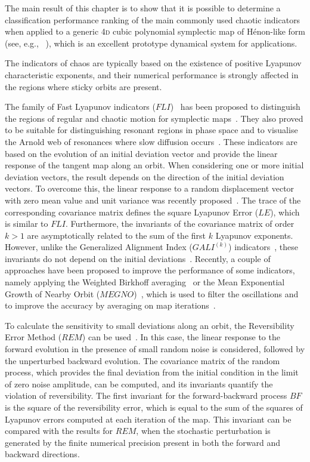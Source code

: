 The main result of this chapter is to show that it is possible to determine a classification performance ranking of the main commonly used chaotic indicators when applied to a generic 4\textsc{d} cubic polynomial symplectic map of H\'enon-like form (see, e.g., ~\cite{Bazzani:262179}), which is an excellent prototype dynamical system for applications.

The indicators of chaos are typically based on the existence of positive Lyapunov characteristic exponents, and their numerical performance is strongly affected in the regions where sticky orbits are present.

The family of Fast Lyapunov indicators ($FLI$)~\cite{Froeschle1997} has been proposed to distinguish the regions of regular and chaotic motion for symplectic maps~\cite{SZEZECH2005394}. They also proved to be suitable for distinguishing resonant regions in phase space and to visualise the Arnold web of resonances where slow diffusion occurs~\cite{Arnold:937549}. These indicators are based on the evolution of an initial deviation vector and provide the linear response of the tangent map along an orbit. When considering one or more initial deviation vectors, the result depends on the direction of the initial deviation vectors. To overcome this, the linear response to a random displacement vector with zero mean value and unit variance was recently proposed~\cite{Turchetti2017}. The trace of the corresponding covariance matrix defines the square Lyapunov Error ($LE$), which is similar to $FLI$. Furthermore, the invariants of the covariance matrix of order $k>1$ are asymptotically related to the sum of the first $k$ Lyapunov exponents. However, unlike the Generalized Alignment Index ($GALI^{(k)}$) indicators~\cite{Bountis2007,Skokos2015}, these invariants do not depend on the initial deviations~\cite{Skokos2008}. Recently, a couple of approaches have been proposed to improve the performance of some indicators, namely applying the Weighted Birkhoff averaging~\cite{Das_2017} or the Mean Exponential Growth of Nearby Orbit ($MEGNO$)~\cite{Cincotta1996}, which is used to filter the oscillations and to improve the accuracy by averaging on map iterations~\cite{Gozdziewski01,Mestre2011}.

To calculate the sensitivity to small deviations along an orbit, the Reversibility Error Method ($REM$) can be used~\cite{Panichi2016,Panichi2017}. In this case, the linear response to the forward evolution in the presence of small random noise is considered, followed by the unperturbed backward evolution. The covariance matrix of the random process, which provides the final deviation from the initial condition in the limit of zero noise amplitude, can be computed, and its invariants quantify the violation of reversibility. The first invariant for the forward-backward process $BF$ is the square of the reversibility error, which is equal to the sum of the squares of Lyapunov errors computed at each iteration of the map. This invariant can be compared with the results for $REM$, when the stochastic perturbation is generated by the finite numerical precision present in both the forward and backward directions. 

